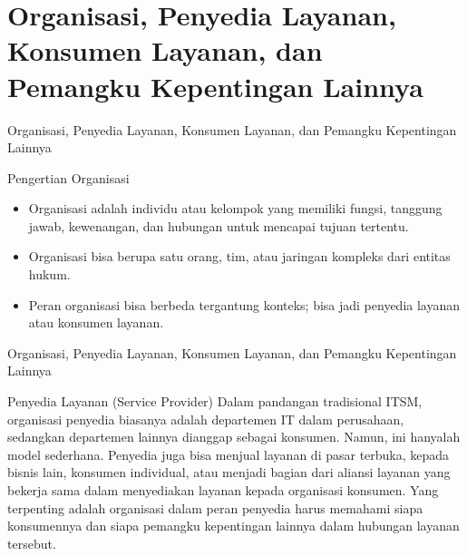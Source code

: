 \documentclass[aspectratio=179]{beamer}
\begin{document}
\section{Organisasi, Penyedia Layanan, Konsumen Layanan, dan Pemangku Kepentingan Lainnya}
\begin{frame}{Organisasi, Penyedia Layanan, Konsumen Layanan, dan Pemangku Kepentingan Lainnya}

    \begin{block}{Pengertian Organisasi}
    \begin{itemize}
        \item Organisasi adalah individu atau kelompok yang memiliki fungsi, tanggung jawab, kewenangan, dan hubungan untuk mencapai tujuan tertentu.
        \item Organisasi bisa berupa satu orang, tim, atau jaringan kompleks dari entitas hukum.
        \item Peran organisasi bisa berbeda tergantung konteks; bisa jadi penyedia layanan atau konsumen layanan.
    \end{itemize}
    \end{block}
  
\end{frame}

\begin{frame}{Organisasi, Penyedia Layanan, Konsumen Layanan, dan Pemangku Kepentingan Lainnya}
\begin{block}{Penyedia Layanan (Service Provider)}
    {Dalam pandangan tradisional ITSM, organisasi penyedia biasanya adalah departemen IT dalam perusahaan, sedangkan departemen lainnya dianggap sebagai konsumen. Namun, ini hanyalah model sederhana. Penyedia juga bisa menjual layanan di pasar terbuka, kepada bisnis lain, konsumen individual, atau menjadi bagian dari aliansi layanan yang bekerja sama dalam menyediakan layanan kepada organisasi konsumen. Yang terpenting adalah organisasi dalam peran penyedia harus memahami siapa konsumennya dan siapa pemangku kepentingan lainnya dalam hubungan layanan tersebut.}
\end{block}
\end{frame}
\end{document}
